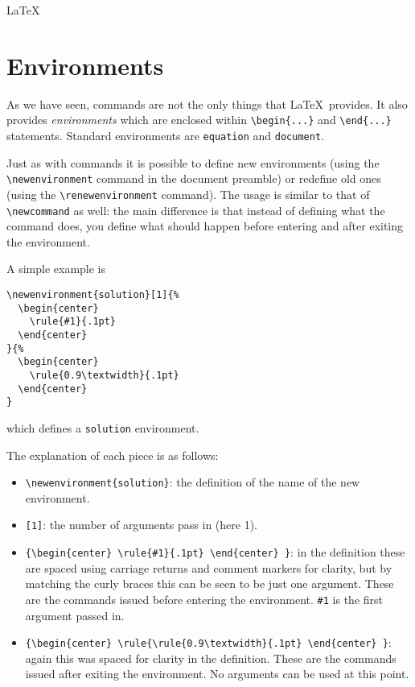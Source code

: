 \begin{chapter}{\LaTeX}
\section{Environments}
\label{sec:environments}

As we have seen, commands are not the only things that \LaTeX\ provides. It also provides \emph{environments} which are enclosed within \verb|\begin{...}| and \verb|\end{...}| statements. Standard environments are \verb|equation| and \verb|document|.

Just as with commands it is possible to define new environments (using the \verb|\newenvironment| command in the document preamble) or redefine old ones (using the \verb|\renewenvironment| command). The usage is similar to that of \verb|\newcommand| as well: the main difference is that instead of defining what the command does, you define what should happen before entering and after exiting the environment.

A simple example is
%
\begin{verbatim}
\newenvironment{solution}[1]{%
  \begin{center}
    \rule{#1}{.1pt}
  \end{center}
}{%
  \begin{center}
    \rule{0.9\textwidth}{.1pt}
  \end{center}
}
\end{verbatim}
%
which defines a \verb|solution| environment.

The explanation of each piece is as follows:
\begin{itemize}
\item \verb|\newenvironment{solution}|: the definition of the name of the new environment.
\item \verb|[1]|: the number of arguments pass in (here 1).
\item \verb|{\begin{center} \rule{#1}{.1pt} \end{center} }|: in the definition these are spaced using carriage returns and comment markers for clarity, but by matching the curly braces this can be seen to be just one argument. These are the commands issued before entering the environment. \verb|#1| is the first argument passed in.
\item \verb|{\begin{center} \rule{\rule{0.9\textwidth}{.1pt} \end{center} }|: again this was spaced for clarity in the definition. These are the commands issued after exiting the environment. No arguments can be used at this point.
\end{itemize}


\end{chapter}

